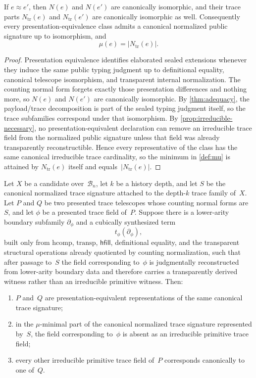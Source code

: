 \documentclass{lmcs}
\newcommand{\B}{\mathcal{B}}
\newcommand{\hcomp}{\mathrm{hcomp}}
\newcommand{\transp}{\mathrm{transp}}
\begin{document}
\begin{prop}
\label{prop:canonical-presentation}
If $e \approx e'$, then $N(e)$ and $N(e')$ are canonically isomorphic, and their trace parts $N_{\mathrm{tr}}(e)$ and $N_{\mathrm{tr}}(e')$ are canonically isomorphic as well. Consequently every presentation-equivalence class admits a canonical normalized public signature up to isomorphism, and
\[
  \mu(e) = |N_{\mathrm{tr}}(e)|.
\]
\end{prop}

\begin{proof}
Presentation equivalence identifies elaborated sealed extensions whenever they induce the same public typing judgment up to definitional equality, canonical telescope isomorphism, and transparent internal normalization. The counting normal form forgets exactly those presentation differences and nothing more, so $N(e)$ and $N(e')$ are canonically isomorphic. By \autoref{thm:adequacy}, the payload/trace decomposition is part of the sealed typing judgment itself, so the trace subfamilies correspond under that isomorphism. By \autoref{prop:irreducible-necessary}, no presentation-equivalent declaration can remove an irreducible trace field from the normalized public signature unless that field was already transparently reconstructible. Hence every representative of the class has the same canonical irreducible trace cardinality, so the minimum in \autoref{def:mu} is attained by $N_{\mathrm{tr}}(e)$ itself and equals~$|N_{\mathrm{tr}}(e)|$.
\end{proof}

\begin{thm}
\label{thm:computational-replacement}
Let $X$ be a candidate over~$\B_n$, let $k$ be a history depth, and let $S$ be the canonical normalized trace signature attached to the depth-$k$ trace family of~$X$. Let $P$ and $Q$ be two presented trace telescopes whose counting normal forms are~$S$, and let $\phi$ be a presented trace field of~$P$. Suppose there is a lower-arity boundary subfamily $\partial_\phi$ and a cubically synthesized term
\[
  t_\phi(\partial_\phi),
\]
built only from $\hcomp$, $\transp$, $\mathsf{hfill}$, definitional equality, and the transparent structural operations already quotiented by counting normalization, such that after passage to~$S$ the field corresponding to~$\phi$ is judgmentally reconstructed from lower-arity boundary data and therefore carries a transparently derived witness rather than an irreducible primitive witness. Then:
\begin{enumerate}
  \item $P$ and~$Q$ are presentation-equivalent representations of the same canonical trace signature;
  \item in the $\mu$-minimal part of the canonical normalized trace signature represented by~$S$, the field corresponding to~$\phi$ is absent as an irreducible primitive trace field;
  \item every other irreducible primitive trace field of~$P$ corresponds canonically to one of~$Q$.
\end{enumerate}
\end{thm}
\end{document}
